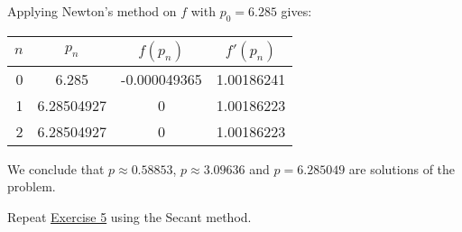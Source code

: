 \documentclass[../../../../Assignments]{subfiles}
\begin{document}
\begin{solution}
\begin{enumerate}[label = \alph*)]
            Applying Newton's method on \(f\) with \(p_0 = \num{6.285}\) gives:

            \begin{table}[H]
                \centering
                \begin{tabular}{r S[table-format=1.8] S[table-format=-1.9] S[table-format=1.8]}
                    \toprule
                    \(n\)  &   {\(p_n\)}   &  {\(f(p_n)\)}  &  {\(f'(p_n)\)}  \\
                      &  6.285        &  -0.000049365 &  1.00186241      \\
                        1  &  6.28504927   &   0           &  1.00186223      \\
                        2  &  6.28504927   &   0           &  1.00186223      \\
                    \bottomrule
                \end{tabular}
            \end{table}

            We conclude that \(p \approx \num{0.58853}\), \(p \approx
            \num{3.09636}\) and \(p = 6.285049\) are solutions of the problem.
        \end{enumerate}
\end{solution}

\begin{exercise}
    Repeat \hyperref[exer:2.3.5]{Exercise 5} using the Secant method.
\end{exercise}
\end{document}
